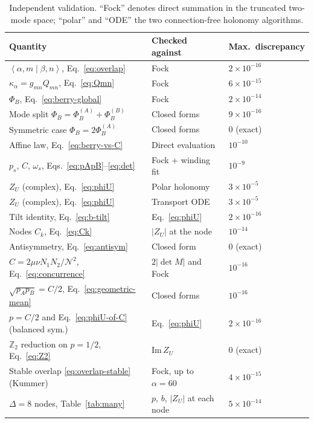 \documentclass[11pt]{article}
\newcommand{\braket}[2]{\left\langle#1\middle|#2\right\rangle}
\begin{document}
\begin{table}[htbp]
\centering
\caption{Independent validation. ``Fock'' denotes direct summation in the
truncated two-mode space; ``polar'' and ``ODE'' the two connection-free
holonomy algorithms.}
\label{tab:validation}
\begin{tabular}{lll}
\toprule
Quantity & Checked against & Max.\ discrepancy\\
\midrule
$\braket{\alpha,m}{\beta,n}$, Eq.~\eqref{eq:overlap} & Fock & $2\times10^{-16}$\\
$\kappa_\alpha=g_{mn}Q_{mn}$, Eq.~\eqref{eq:Qmn} & Fock & $6\times10^{-15}$\\
$\Phi_B$, Eq.~\eqref{eq:berry-global} & Fock & $2\times10^{-14}$\\
Mode split $\Phi_B=\Phi_B^{(A)}+\Phi_B^{(B)}$ & Closed forms & $9\times10^{-16}$\\
Symmetric case $\Phi_B=2\Phi_B^{(A)}$ & Closed forms & $0$ (exact)\\
Affine law, Eq.~\eqref{eq:berry-vs-C} & Direct evaluation & $10^{-10}$\\
$p_s$, $C$, $\omega_s$, Eqs.~\eqref{eq:pApB}--\eqref{eq:det} & Fock + winding fit & $10^{-9}$\\
$Z_U$ (complex), Eq.~\eqref{eq:phiU} & Polar holonomy & $3\times10^{-5}$\\
$Z_U$ (complex), Eq.~\eqref{eq:phiU} & Transport ODE & $3\times10^{-5}$\\
Tilt identity, Eq.~\eqref{eq:b-tilt} & Eq.~\eqref{eq:phiU} & $2\times10^{-16}$\\
Nodes $C_k$, Eq.~\eqref{eq:Ck} & $|Z_U|$ at the node & $10^{-14}$\\
Antisymmetry, Eq.~\eqref{eq:antisym} & Closed form & $0$ (exact)\\
$C=2\mu\nu N_1N_2/\mathcal N^2$, Eq.~\eqref{eq:concurrence} & $2|\det M|$ and Fock & $10^{-16}$\\
$\sqrt{p_Ap_B}=C/2$, Eq.~\eqref{eq:geometric-mean} & Closed forms & $10^{-16}$\\
$p=C/2$ and Eq.~\eqref{eq:phiU-of-C} (balanced sym.) & Eq.~\eqref{eq:phiU} & $2\times10^{-16}$\\
$\mathbb{Z}_2$ reduction on $p=1/2$, Eq.~\eqref{eq:Z2} & $\mathrm{Im}\,Z_U$ & $0$ (exact)\\
Stable overlap \eqref{eq:overlap-stable} (Kummer) & Fock, up to $\alpha=60$ & $4\times10^{-15}$\\
$\Delta=8$ nodes, Table~\ref{tab:many} & $p$, $b$, $|Z_U|$ at each node & $5\times10^{-14}$\\

\end{tabular}
\end{table}
\end{document}
